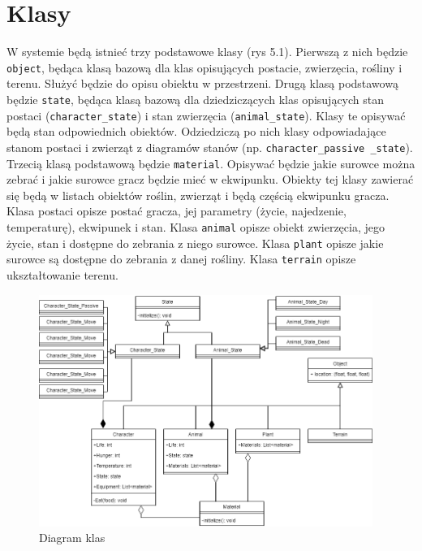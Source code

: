 \chapter{Klasy}

W systemie będą istnieć trzy podstawowe klasy (rys 5.1). Pierwszą z nich będzie \texttt{object}, będąca klasą bazową dla klas opisujących postacie, zwierzęcia, rośliny i terenu. Służyć będzie do opisu obiektu w przestrzeni. 
Drugą klasą podstawową będzie \texttt{state}, będąca klasą bazową dla dziedziczących klas opisujących stan postaci (\texttt{character\_state}) i stan zwierzęcia (\texttt{animal\_state}). Klasy te opisywać będą stan odpowiednich obiektów. Odziedziczą po nich klasy odpowiadające stanom postaci i zwierząt z diagramów stanów (np. \texttt{character\_passive \_state}).
Trzecią klasą podstawową będzie \texttt{material}. Opisywać będzie jakie surowce można zebrać i jakie surowce gracz będzie mieć w ekwipunku. Obiekty tej klasy zawierać się będą w listach obiektów roślin, zwierząt i będą częścią ekwipunku gracza.
Klasa postaci opisze postać gracza, jej parametry (życie, najedzenie, temperaturę), ekwipunek i stan.
Klasa \texttt{animal} opisze obiekt zwierzęcia, jego życie, stan i dostępne do zebrania z niego surowce.
Klasa \texttt{plant} opisze jakie surowce są dostępne do zebrania z danej rośliny.
Klasa \texttt{terrain} opisze ukształtowanie terenu.

\begin{figure}[H]
    \centering
        \includegraphics[width=0.97\textwidth]{Graphics/classes.png}
         \caption{Diagram klas}
\end{figure}

